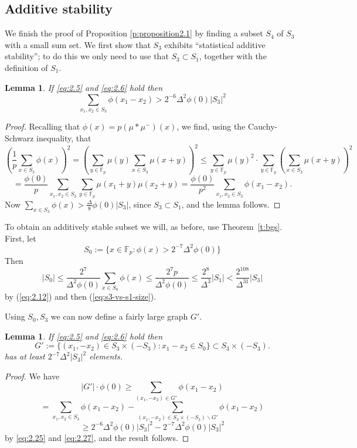 \documentclass[11pt]{amsart}
\newtheorem{lem}[thm]{Lemma}
\newcommand{\fp}{\mathbb{F}_p}
\begin{document}
\subsection{Additive stability}
We finish the proof of Proposition \ref{p:proposition2.1} by finding
a subset $S_4$ of $S_3$ with a small sum set. We first show that
$S_3$ exhibits ``statistical additive stability''; to do this we
only need to use that $S_3 \subset S_1$, together with the
definition of $S_1$.
\begin{lem}  If \eqref{eq:2.5} and \eqref{eq:2.6} hold then
\begin{equation}
\label{eq:2.25} \sum_{x_1, x_2 \in S_3} \phi(x_1 - x_2)
>
2^{-6} \Delta^2 \phi(0) |S_3|^2
\end{equation}

\end{lem}
\begin{proof}
Recalling that $\phi(x) = p (\mu * \mu^-)(x)$, we find, using the
Cauchy-Schwarz inequality, that
$$
\left( \frac 1p \sum_{x \in S_3} \phi(x) \right)^2= \left(
 \sum_{y \in \fp} \mu(y) \sum_{x \in S_3} \mu(x+y) \right)^2 \leq
\sum_{y \in \fp} \mu(y)^2 \cdot \sum_{y \in \fp} \left( \sum_{x \in
S_3} \mu(x+y) \right)^2
$$
$$
 = \frac{\phi(0)}p \sum_{x_1, x_2 \in S_3}
\sum_{y \in \fp} \mu(x_1+y) \mu(x_2+y) = \frac{\phi(0)}{p^2}
\sum_{x_1, x_2 \in S_3} \phi(x_1 - x_2) .
$$
Now $\sum_{x \in S_3} \phi(x) > \frac{\Delta}{8} \phi(0) |S_3|$,
since $S_3 \subset S_1$, and the lemma follows.
\end{proof}

To obtain an additively stable subset we will, as before, use
Theorem~\ref{t:bgs}.  First, let
\begin{equation}
\label{eq:2.27} S_0 := \{ x \in \fp : \phi(x) > 2^{-7} \Delta^2
\phi(0) \}
\end{equation}
Then
$$
|S_0| \leq \frac{2^{7}}{\Delta^2\phi(0)} \sum_{x \in S_0} \phi(x)
\leq \frac{2^{7} p}{\Delta^2\phi(0)}  \leq \frac{2^{8}}{\Delta^3}
|S_1| < \frac{2^{108}}{\Delta^{31}} |S_3|
$$
by (\ref{eq:2.12}) and then (\ref{eq:s3-vs-s1-size}).





Using $S_0, S_3$ we can now define a fairly large graph $G'$.
\begin{lem} If \eqref{eq:2.5} and \eqref{eq:2.6} hold then
$$
G' := \{ (x_1, -x_2) \in S_3 \times (-S_3) : x_1 - x_2 \in S_0 \}
\subset S_3 \times (-S_3).
$$
has at least $2^{-7} \Delta^2 |S_3|^2$ elements.
\end{lem}
\begin{proof}
We have
$$
|G'| \cdot \phi(0) \geq \sum_{ (x_1, -x_2) \in G'} \phi(x_1 - x_2)
$$
$$
= \sum_{ x_1, x_2 \in S_3} \phi(x_1 - x_2) - \sum_{ (x_1, -x_2) \in
S_3 \times (-S_3) \backslash G'} \phi(x_1 - x_2)
$$
$$
\geq 2^{-6} \Delta^2 \phi(0) |S_3|^2-2^{-7} \Delta^2 \phi(0)|S_3|^2
$$
by \eqref{eq:2.25} and \eqref{eq:2.27}, and the result follows.
\end{proof}
\end{document}

